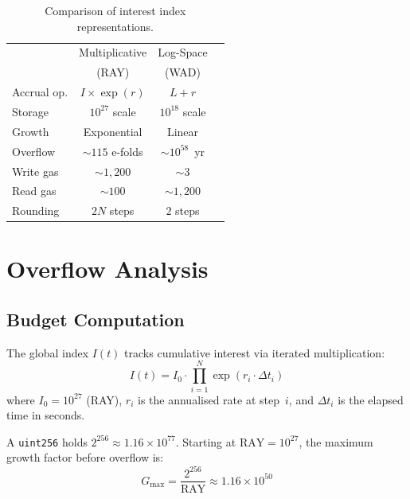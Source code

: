 \documentclass[10pt,a4paper,twocolumn]{article}
\begin{document}
\begin{table}[htbp]
\centering
\caption{Comparison of interest index representations.}
\label{tab:comparison}
\small
\begin{tabular*}{0.95\columnwidth}{@{\extracolsep{\fill}}lccc@{}}
\toprule
& Multiplicative & Log-Space \\
& (RAY) & (WAD) \\
\midrule
Accrual op. & $I \times \exp(r)$ & $L + r$ \\
Storage & $10^{27}$ scale & $10^{18}$ scale \\
Growth & Exponential & Linear \\
Overflow & ${\sim}115$ e-folds & ${\sim}10^{58}$~yr \\
Write gas & ${\sim}1{,}200$ & ${\sim}3$ \\
Read gas & ${\sim}100$ & ${\sim}1{,}200$ \\
Rounding & $2N$ steps & $2$ steps \\
\bottomrule
\end{tabular*}
\end{table}

\section{Overflow Analysis}
\label{sec:overflow}

\subsection{Budget Computation}
\label{subsec:budget}

\begin{definition}
\label{def:mult-index}
The global index $I(t)$ tracks cumulative interest via iterated multiplication:
\begin{equation}
\label{eq:mult-index}
I(t) = I_0 \cdot \prod_{i=1}^{N} \exp(r_i \cdot \Delta t_i)
\end{equation}
where $I_0 = 10^{27}$ (RAY), $r_i$ is the annualised rate at step~$i$, and $\Delta t_i$ is the elapsed time in seconds.
\end{definition}

A \texttt{uint256} holds $2^{256} \approx 1.16 \times 10^{77}$. Starting at $\text{RAY} = 10^{27}$, the maximum growth factor before overflow is:
\begin{equation}
\label{eq:max-growth}
G_{\max} = \frac{2^{256}}{\text{RAY}} \approx 1.16 \times 10^{50}
\end{equation}
\end{document}
